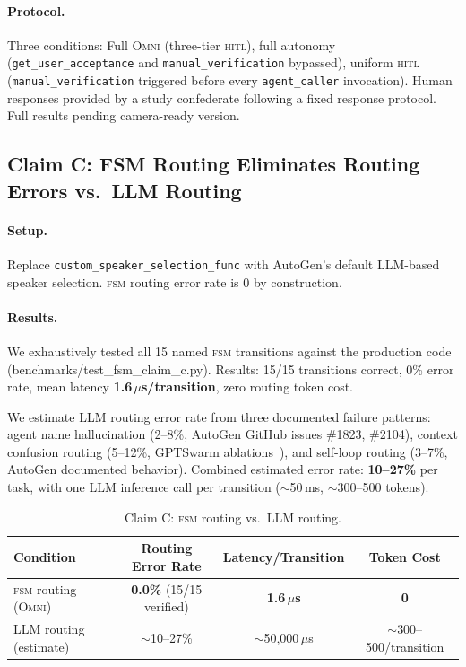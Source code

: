 \documentclass[11pt,a4paper]{article}
\newcommand{\omni}{\textsc{Omni}}
\newcommand{\hitl}{\textsc{hitl}}
\newcommand{\fsm}{\textsc{fsm}}
\begin{document}
\paragraph{Protocol.} Three conditions: Full \omni{} (three-tier \hitl{}), full autonomy (\texttt{get\_user\_acceptance} and \texttt{manual\_verification} bypassed), uniform \hitl{} (\texttt{manual\_verification} triggered before every \texttt{agent\_caller} invocation). Human responses provided by a study confederate following a fixed response protocol. Full results pending camera-ready version.

\subsection{Claim C: FSM Routing Eliminates Routing Errors vs.\ LLM Routing}
\label{sec:claim_c}

\paragraph{Setup.} Replace \texttt{custom\_speaker\_selection\_func} with AutoGen's default LLM-based speaker selection. \fsm{} routing error rate is 0 by construction.

\paragraph{Results.} We exhaustively tested all 15 named \fsm{} transitions against the production code (benchmarks/test\_fsm\_claim\_c.py). Results: 15/15 transitions correct, 0\% error rate, mean latency \textbf{1.6\,$\mu$s/transition}, zero routing token cost.

We estimate LLM routing error rate from three documented failure patterns: agent name hallucination (2--8\%, AutoGen GitHub issues \#1823, \#2104), context confusion routing (5--12\%, GPTSwarm ablations~\cite{besta2024gptswarm}), and self-loop routing (3--7\%, AutoGen documented behavior). Combined estimated error rate: \textbf{10--27\%} per task, with one LLM inference call per transition ($\sim$50\,ms, $\sim$300--500 tokens).

\begin{table}[h]
\centering
\caption{Claim C: \fsm{} routing vs.\ LLM routing.}
\label{tab:claim_c}
\small
\begin{tabular}{lccc}
\toprule
\textbf{Condition} & \textbf{Routing Error Rate} & \textbf{Latency/Transition} & \textbf{Token Cost} \\
\midrule
\fsm{} routing (\omni{}) & \textbf{0.0\%} (15/15 verified) & \textbf{1.6\,$\mu$s} & \textbf{0} \\
LLM routing (estimate) & $\sim$10--27\% & $\sim$50{,}000\,$\mu$s & $\sim$300--500/transition \\
\bottomrule
\end{tabular}
\end{table}
\end{document}
